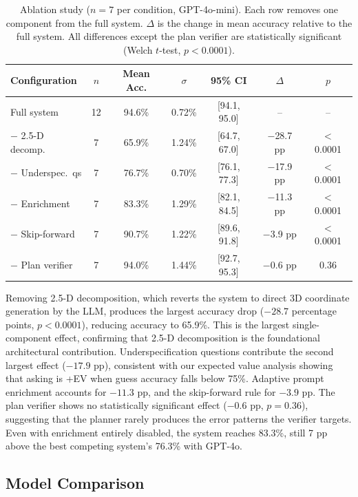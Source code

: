 \documentclass{article}
\begin{document}
\begin{table}[ht]
\centering
\small
\begin{tabular}{@{}lcccccc@{}}
\toprule
\textbf{Configuration} & $n$ & \textbf{Mean Acc.} & $\sigma$ & \textbf{95\% CI} & $\Delta$ & $p$ \\
\midrule
Full system          & 12 & 94.6\% & 0.72\% & [94.1, 95.0] & --          & -- \\
$-$ 2.5-D decomp.   &  7 & 65.9\% & 1.24\% & [64.7, 67.0] & $-$28.7 pp & $<$0.0001 \\
$-$ Underspec.\ qs  &  7 & 76.7\% & 0.70\% & [76.1, 77.3] & $-$17.9 pp & $<$0.0001 \\
$-$ Enrichment       &  7 & 83.3\% & 1.29\% & [82.1, 84.5] & $-$11.3 pp & $<$0.0001 \\
$-$ Skip-forward     &  7 & 90.7\% & 1.22\% & [89.6, 91.8] & $-$3.9 pp  & $<$0.0001 \\
$-$ Plan verifier    &  7 & 94.0\% & 1.44\% & [92.7, 95.3] & $-$0.6 pp  & 0.36 \\
\bottomrule
\end{tabular}
\caption{Ablation study ($n = 7$ per condition, GPT-4o-mini). Each row
removes one component from the full system. $\Delta$ is the change in mean
accuracy relative to the full system. All differences except the plan
verifier are statistically significant (Welch $t$-test, $p < 0.0001$).}
\label{tab:ablation}
\end{table}

Removing 2.5-D decomposition, which reverts the system to direct 3D
coordinate generation by the LLM, produces the largest accuracy drop
($-28.7$ percentage points, $p < 0.0001$), reducing accuracy to 65.9\%.
This is the largest single-component effect,
confirming that 2.5-D decomposition is the foundational architectural
contribution. Underspecification questions contribute
the second largest effect ($-17.9$ pp), consistent with our expected value
analysis showing that asking is +EV when guess accuracy falls below 75\%.
Adaptive prompt enrichment accounts for $-11.3$ pp, and the skip-forward
rule for $-3.9$ pp. The plan verifier shows no statistically significant
effect ($-0.6$ pp, $p = 0.36$), suggesting that the planner rarely
produces the error patterns the verifier targets.
Even with enrichment entirely disabled, the system reaches 83.3\%,
still 7 pp above the best competing system's 76.3\% with GPT-4o.

\subsection{Model Comparison}
\end{document}
